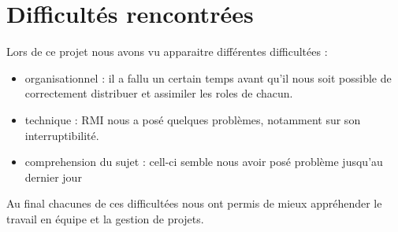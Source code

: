 \section{Difficultés rencontrées}
Lors de ce projet nous avons vu apparaitre différentes difficultées : 
\begin{itemize}
 \item organisationnel : il a fallu un certain temps avant qu'il nous soit possible de correctement distribuer et assimiler les roles de chacun.
 \item technique : RMI nous a posé quelques problèmes, notamment sur son interruptibilité.
 \item comprehension du sujet : cell-ci semble nous avoir posé problème jusqu'au dernier jour
\end{itemize}


Au final chacunes de ces difficultées nous ont permis de mieux appréhender le travail en équipe et la gestion de projets.
